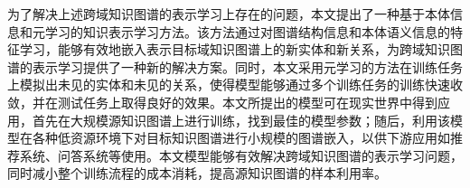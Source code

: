 为了解决上述跨域知识图谱的表示学习上存在的问题，本文提出了一种基于本体信息和元学习的知识表示学习方法。该方法通过对图谱结构信息和本体语义信息的特征学习，能够有效地嵌入表示目标域知识图谱上的新实体和新关系，为跨域知识图谱的表示学习提供了一种新的解决方案。同时，本文采用元学习的方法在训练任务上模拟出未见的实体和未见的关系，使得模型能够通过多个训练任务的训练快速收敛，并在测试任务上取得良好的效果。本文所提出的模型可在现实世界中得到应用，首先在大规模源知识图谱上进行训练，找到最佳的模型参数；随后，利用该模型在各种低资源环境下对目标知识图谱进行小规模的图谱嵌入，以供下游应用如推荐系统、问答系统等使用。本文模型能够有效解决跨域知识图谱的表示学习问题，同时减小整个训练流程的成本消耗，提高源知识图谱的样本利用率。





